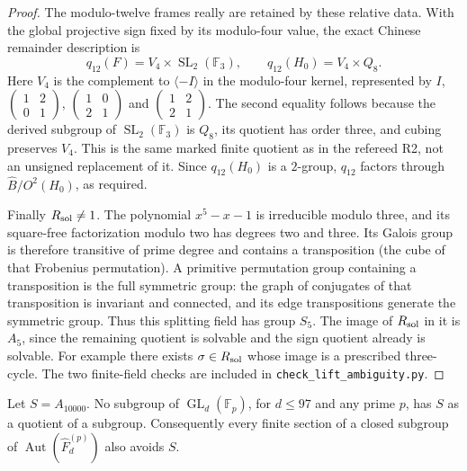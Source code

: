 \begin{proof}
The modulo-twelve frames really are retained by
these relative data.  With the global projective
sign fixed by its modulo-four value, the exact
Chinese remainder description is
\[
 q_{12}(F)=V_4\times\operatorname{SL}_2(\mathbb F_3),
       \qquad q_{12}(H_0)=V_4\times Q_8.
\]
Here $V_4$ is the complement to $\langle-I\rangle$
in the modulo-four kernel, represented by
$I$, $\left(\begin{smallmatrix}1&2\\0&1\end{smallmatrix}\right)$,
$\left(\begin{smallmatrix}1&0\\2&1\end{smallmatrix}\right)$
and $\left(\begin{smallmatrix}1&2\\2&1\end{smallmatrix}\right)$.
The second equality follows because the derived
subgroup of $\operatorname{SL}_2(\mathbb F_3)$
is $Q_8$, its quotient has order three, and
cubing preserves $V_4$.  This is the same
marked finite quotient as in the refereed R2,
not an unsigned replacement of it.  Since
$q_{12}(H_0)$ is a $2$-group, $q_{12}$ factors
through $\widehat B/O^2(H_0)$, as required.

Finally $R_{\rm sol}\ne1$.  The polynomial
$x^5-x-1$ is irreducible modulo three,
and its square-free factorization modulo
two has degrees two and three.  Its
Galois group is therefore transitive of
prime degree and contains a transposition
(the cube of that Frobenius permutation).
A primitive permutation group containing
a transposition is the full symmetric
group: the graph of conjugates of that
transposition is invariant and connected,
and its edge transpositions generate the
symmetric group.  Thus this splitting
field has group $S_5$.  The image of
$R_{\rm sol}$ in it is $A_5$, since the
remaining quotient is solvable and the
sign quotient already is solvable.  For
example there exists $\sigma\in R_{\rm sol}$
whose image is a prescribed three-cycle.
The two finite-field checks are included
in \texttt{check\_lift\_ambiguity.py}.
\end{proof}

Let $S=A_{10000}$.  No subgroup of
$\operatorname{GL}_d(\mathbb F_p)$, for $d\leq97$
and any prime $p$, has $S$ as a quotient of a
subgroup.  Consequently every finite section
of a closed subgroup of
$\operatorname{Aut}(\widehat F_d^{(p)})$
also avoids $S$.

